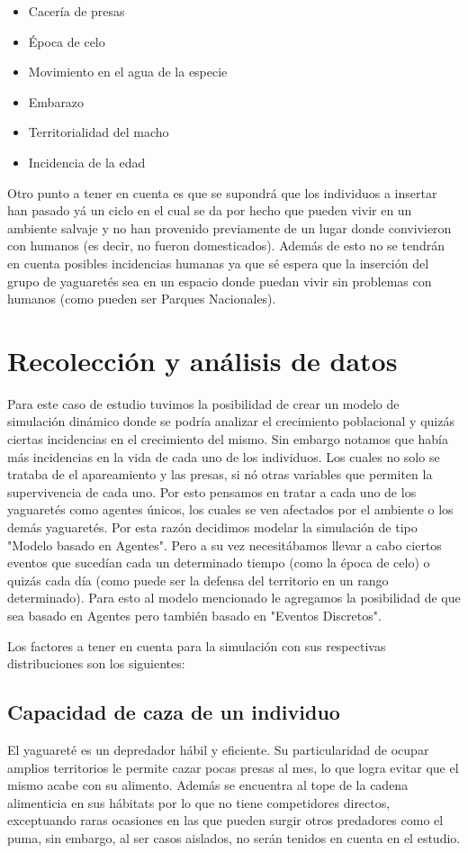     \begin{itemize}
        \item Cacería de presas
        \item Época de celo
        \item Movimiento en el agua de la especie
        \item Embarazo
        \item Territorialidad del macho
        \item Incidencia de la edad
    \end{itemize}

    Otro punto a tener en cuenta es que se supondrá que los individuos a insertar han pasado yá un ciclo en el cual se da por hecho que pueden vivir en un ambiente salvaje y no han provenido previamente de un lugar donde convivieron con humanos (es decir, no fueron domesticados).
    Además de esto no se tendrán en cuenta posibles incidencias humanas ya que sé espera que la inserción del grupo de yaguaretés sea en un espacio donde puedan vivir sin problemas con humanos (como pueden ser Parques Nacionales).

\section{Recolección y análisis de datos}
    Para este caso de estudio tuvimos la posibilidad de crear un modelo de simulación dinámico donde se podría analizar el crecimiento poblacional y quizás ciertas incidencias en el crecimiento del mismo. Sin embargo notamos que había más incidencias en
    la vida de cada uno de los individuos. Los cuales no solo se trataba de el apareamiento y las presas, si nó otras variables que permiten la supervivencia de cada uno. Por esto pensamos en tratar a cada uno de los yaguaretés como agentes únicos, los cuales
    se ven afectados por el ambiente o los demás yaguaretés. Por esta razón decidimos modelar la simulación de tipo "Modelo basado en Agentes". Pero a su vez necesitábamos llevar a cabo ciertos eventos que sucedían cada un determinado tiempo (como la época de celo)
    o quizás cada día (como puede ser la defensa del territorio en un rango determinado). Para esto al modelo mencionado le agregamos la posibilidad de que sea basado en Agentes pero también basado en "Eventos Discretos".

    Los factores a tener en cuenta para la simulación con sus respectivas distribuciones son los siguientes:
    
   \subsection{Capacidad de caza de un individuo}
    El yaguareté es un depredador hábil y eficiente. Su particularidad de ocupar amplios territorios le permite cazar pocas presas al mes, lo que logra evitar que el mismo acabe con su alimento. Además se encuentra al tope de la cadena alimenticia en sus hábitats por lo que no tiene competidores directos, exceptuando raras ocasiones en las que pueden surgir otros predadores como el puma, sin embargo, al ser casos aislados, no serán tenidos en cuenta en el estudio.
    

